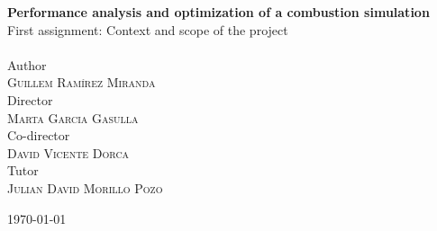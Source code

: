 \begin{titlepage}
\begin{center}
    {
      \LARGE\bfseries Performance analysis and optimization of a combustion simulation\\[0.2cm]
    }
    {\large First assignment: Context and scope of the project}
    \\[0.4cm]\HRule\\[1cm]

    {\large Author}\\[0.1cm]
    \textsc{\large Guillem Ramírez Miranda}\\[0.4cm]
    {\large Director}\\[0.1cm]
    \textsc{\large Marta Garcia Gasulla}\\[0.4cm]
    {\large Co-director}\\[0.1cm]
    \textsc{\large David Vicente Dorca}\\[0.4cm]
    {\large Tutor}\\[0.1cm]
    \textsc{\large Julian David Morillo Pozo}\\[0.1cm]
    \vfill
    {\large \today\par}


  \end{center}


\end{titlepage}
